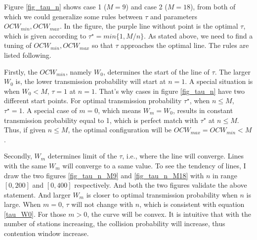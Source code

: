\documentclass[journal]{IEEEtran}
\begin{document}
Figure \ref{fig_tau_n} shows case 1 ($M=9$) and case 2 ($M=18$), from both of which we could generalize some rules between $\tau$ and parameters $OCW_{min}, OCW_{max}$.
In the figure, the purple line without point is the optimal $\tau$, which is given according to $\tau^\star = min\lbrace 1, M/n \rbrace$.
As stated above, we need to find a tuning of $OCW_{min}, OCW_{max}$ so that $\tau$ approaches the optimal line. The rules are listed following.

Firstly, the $OCW_{min}$, namely $W_0$, determines the start of the line of $\tau$. The larger $W_0$ is, the lower transmission probability will start at $n=1$.
A special situation is when $W_0<M$, $\tau=1$ at $n=1$. 
That's why cases in figure \ref{fig_tau_n} have two different start points.
For optimal transmission probability $\tau^\star$, when $n \leq M$, $\tau^\star = 1$. 
A special case of $m=0$, which means $W_m=W_0$, results in constant transmission probability equal to 1, which is perfect match with $\tau^\star$ at $n\leq M$.
Thus, if given $n\leq M$, the optimal configuration will be $OCW_{max}= OCW_{min} < M$. 


Secondly, $W_m$ determines limit of the $\tau$, i.e., where the line will converge. 
Lines with the same $W_m$ will converge to a same value. 
To see the tendency of lines, I draw the two figures \ref{fig_tau_n_M9} and \ref{fig_tau_n_M18} with $n$ in range $[0,200]$ and $[0,400]$ respectively. 
And both the two figures validate the above statement.
And larger $W_m$ is closer to optimal transmission probability when $n$ is large. 
When $m=0$, $\tau$ will not change with $n$, which is consistent with equation \ref{tau_W0}.
For those $m>0$, the curve will be convex. It is intuitive that with the number of stations increasing, the collision probability will increase, thus contention window increase. 
\end{document}
